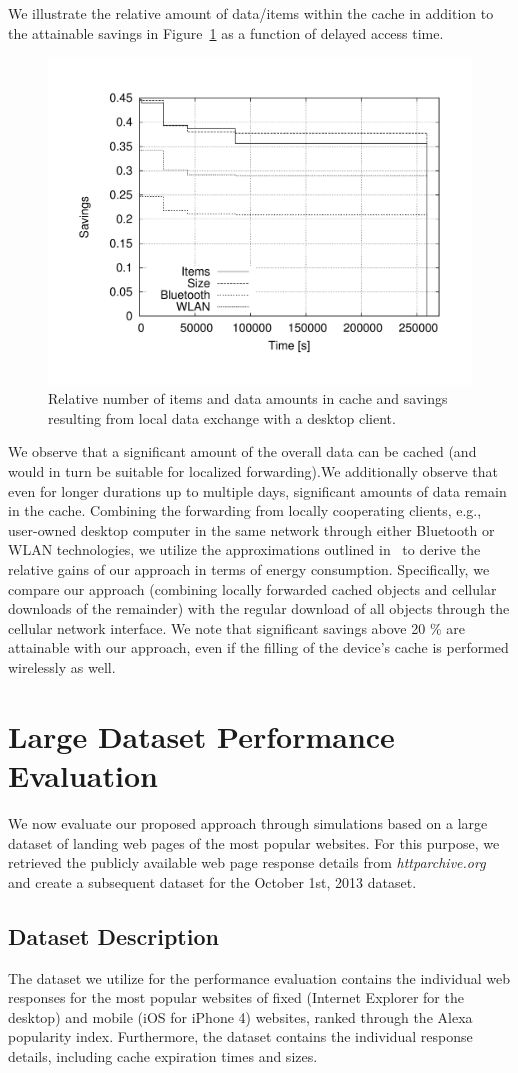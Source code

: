 \documentclass[letterpaper,journal,onecolumn,draftcls]{IEEEtran}
\begin{document}
We illustrate the relative amount of data/items within the cache in addition to the attainable savings in Figure~\ref{fig:rel_ios_time} as a function of delayed access time. 
\begin{figure}
	\centering
	\includegraphics[width=.5\linewidth]{rel_ios_time}
	\caption{Relative number of items and data amounts in cache and savings resulting from local data exchange with a desktop client.}
	\label{fig:rel_ios_time}
\end{figure}
We observe that a significant amount of the overall data can be cached (and would in turn be suitable for localized forwarding).We additionally observe that even for longer durations up to multiple days, significant amounts of data remain in the cache.
Combining the forwarding from locally cooperating clients, e.g., user-owned desktop computer in the same network through either Bluetooth or WLAN technologies, we utilize the approximations outlined in~\cite{Se13} to derive the relative gains of our approach in terms of energy consumption. 
Specifically, we compare our approach (combining locally forwarded cached objects and cellular downloads of the remainder) with the regular download of all objects through the cellular network interface. 
We note that significant savings above 20 \% are attainable with our approach, even if the filling of the device's cache is performed wirelessly as well.



\section{Large Dataset Performance Evaluation}
\label{s:large}
We now evaluate our proposed approach through simulations based on a large dataset of landing web pages of the most popular websites.
For this purpose, we retrieved the publicly available web page response details from \emph{httparchive.org} and create a subsequent dataset for the October 1st, 2013 dataset.

\subsection{Dataset Description}
The dataset we utilize for the performance evaluation contains the individual web responses for the most popular websites of fixed (Internet Explorer for the desktop) and mobile (iOS for iPhone 4) websites, ranked through the Alexa popularity index.
Furthermore, the dataset contains the individual response details, including cache expiration times and sizes. 
\end{document}
